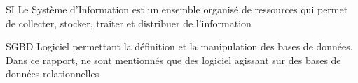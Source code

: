                            {SI}
                           {Le Système d'Information est un ensemble organisé de ressources qui permet de collecter, stocker, traiter et distribuer de l'information}

                           {SGBD}
                           {Logiciel permettant la définition et la manipulation des bases de données. Dans ce rapport, ne sont mentionnés que des logiciel agissant sur des bases de données relationnelles}
